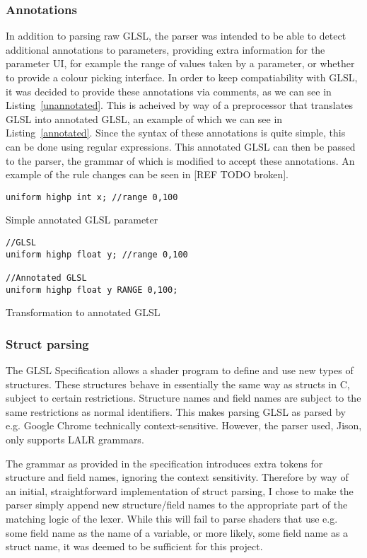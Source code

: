 \documentclass[12pt,twoside,notitlepage]{report}
\begin{document}
\subsubsection{Annotations}
In addition to parsing raw GLSL, the parser was intended to be able to detect additional annotations to parameters, providing extra information for the parameter UI, for example the range of values taken by a parameter, or whether to provide a colour picking interface. In order to keep compatiability with GLSL, it was decided to provide these annotations via comments, as we can see in Listing~\ref{unannotated}. This is acheived by way of a preprocessor that translates GLSL into annotated GLSL, an example of which we can see in Listing~\ref{annotated}. Since the syntax of these annotations is quite simple, this can be done using regular expressions. This annotated GLSL can then be passed to the parser, the grammar of which is modified to accept these annotations. An example of the rule changes can be seen in [REF TODO broken].

\begin{listing}
\begin{verbatim}
uniform highp int x; //range 0,100
\end{verbatim}
\caption{Simple annotated GLSL parameter\label{unannotated}}
\end{listing}

\begin{listing}
\begin{verbatim}
//GLSL
uniform highp float y; //range 0,100

//Annotated GLSL
uniform highp float y RANGE 0,100;
\end{verbatim}
\caption{Transformation to annotated GLSL\label{annotated}}
\end{listing}

\subsubsection{Struct parsing}
\label{struct-parse}
The GLSL Specification \cite{glsl-spec} allows a shader program to define and use new types of structures. These structures behave in essentially the same way as structs in C, subject to certain restrictions. Structure names and field names are subject to the same restrictions as normal identifiers. This makes parsing GLSL as parsed by e.g. Google Chrome technically context-sensitive. However, the parser used, Jison, only supports LALR grammars.

The grammar as provided in the specification introduces extra tokens for structure and field names, ignoring the context sensitivity. Therefore by way of an initial, straightforward implementation of struct parsing, I chose to make the parser simply append new structure/field names to the appropriate part of the matching logic of the lexer. While this will fail to parse shaders that use e.g. some field name as the name of a variable, or more likely, some field name as a struct name, it was deemed to be sufficient for this project.
\end{document}
